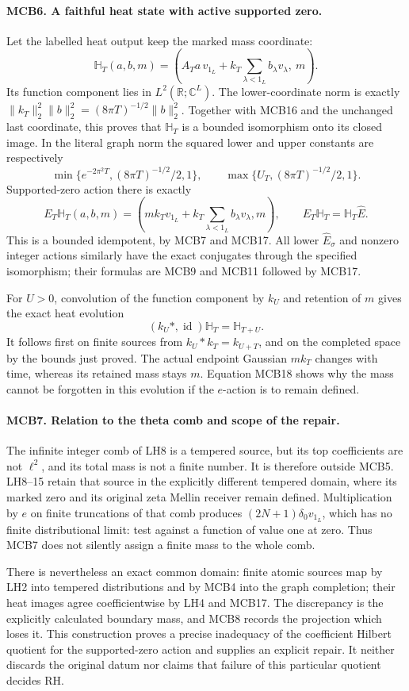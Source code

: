\paragraph{MCB6. A faithful heat state with active supported zero.}
Let the labelled heat output keep the marked mass coordinate:
\[
 \mathbb H_T(a,b,m)=
   \left(A_Ta\,v_{1_L}+k_T\sum_{\lambda<1_L}b_\lambda v_\lambda,
           \ m\right).                             \tag{MCB17}
\]
Its function component lies in \(L^2(\mathbb R;\mathbb C^L)\).
The lower-coordinate norm is exactly
\(\|k_T\|_2^2\|b\|_2^2=(8\pi T)^{-1/2}\|b\|_2^2\).
Together with MCB16 and the unchanged last coordinate, this proves
that \(\mathbb H_T\) is a bounded isomorphism onto its closed
image. In the literal graph norm the squared lower and upper
constants are respectively
\[
 \min\{e^{-2\pi^2T},(8\pi T)^{-1/2}/2,1\},\qquad
 \max\{U_T,(8\pi T)^{-1/2}/2,1\}.
\]
Supported-zero action
there is exactly
\[
 E_T\mathbb H_T(a,b,m)
   =\left(m k_Tv_{1_L}+k_T\sum_{\lambda<1_L}b_\lambda v_\lambda,
                  m\right),\qquad
 E_T\mathbb H_T=\mathbb H_T\widehat E.              \tag{MCB18}
\]
This is a bounded idempotent, by MCB7 and MCB17. All lower
\(\widehat E_\sigma\) and nonzero integer actions similarly
have the exact conjugates through the specified isomorphism;
their formulas are MCB9 and MCB11 followed by MCB17.

For \(U>0\), convolution of the function component by \(k_U\)
and retention of \(m\) gives the exact heat evolution
\[
 (k_U*,\operatorname{id})\mathbb H_T
                  =\mathbb H_{T+U}.              \tag{MCB19}
\]
It follows first on finite sources from \(k_U*k_T=k_{U+T}\),
and on the completed space by the bounds just proved. The actual
endpoint Gaussian \(m k_T\) changes with time, whereas its
retained mass stays \(m\). Equation MCB18 shows why the mass
cannot be forgotten in this evolution if the \(e\)-action is
to remain defined.

\paragraph{MCB7. Relation to the theta comb and scope of the repair.}
The infinite integer comb of LH8 is a tempered source, but its
top coefficients are not \(\ell^2\), and its total mass is not
a finite number. It is therefore outside MCB5. LH8--15 retain
that source in the explicitly different tempered domain, where
its marked zero and its original zeta Mellin receiver remain
defined. Multiplication by \(e\) on finite truncations of that
comb produces \((2N+1)\delta_0v_{1_L}\), which has no finite
distributional limit: test against a function of value one at
zero. Thus MCB7 does not silently assign a finite mass to the
whole comb.

There is nevertheless an exact common domain: finite atomic
sources map by LH2 into tempered distributions and by MCB4 into
the graph completion; their heat images agree coefficientwise
by LH4 and MCB17. The discrepancy is the explicitly calculated
boundary mass, and MCB8 records the projection which loses it.
This construction proves a precise inadequacy of the coefficient
Hilbert quotient for the supported-zero action and supplies an
explicit repair. It neither discards the original datum nor
claims that failure of this particular quotient decides RH.
